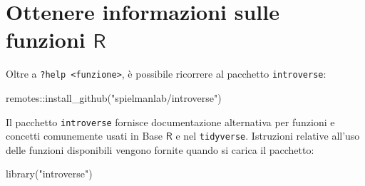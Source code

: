\documentclass[
  11pt,
]{krantz}
\makeatletter
\newenvironment{Shaded}{\begin{snugshade}}{\end{snugshade}}
\newcommand{\FunctionTok}[1]{\textcolor[rgb]{0,0,0}{#1}}
\newcommand{\NormalTok}[1]{#1}
\newcommand{\SpecialCharTok}[1]{\textcolor[rgb]{0,0,0}{#1}}
\newcommand{\StringTok}[1]{\textcolor[rgb]{0.5,0.5,0.5}{#1}}
\newenvironment{kframe}{%
\medskip{}
\setlength{\fboxsep}{.8em}
 \def\at@end@of@kframe{}%
 \ifinner\ifhmode%
  \def\at@end@of@kframe{\end{minipage}}%
  \begin{minipage}{\columnwidth}%
 \fi\fi%
 \def\FrameCommand##1{\hskip\@totalleftmargin \hskip-\fboxsep
 \colorbox{shadecolor}{##1}\hskip-\fboxsep
     \hskip-\linewidth \hskip-\@totalleftmargin \hskip\columnwidth}%
 \MakeFramed {\advance\hsize-\width
   \@totalleftmargin\z@ \linewidth\hsize
   \@setminipage}}%
 {\par\unskip\endMakeFramed%
 \at@end@of@kframe}
\renewenvironment{Shaded}{\begin{kframe}}{\end{kframe}}
\newcommand{\R}{\textsf{R}} %
\theoremstyle{definition}
\theoremstyle{definition}
\theoremstyle{definition}
\theoremstyle{definition}
\theoremstyle{remark}
\makeatother
\begin{document}
\hypertarget{ottenere-informazioni-sulle-funzioni-r}{%
\section{\texorpdfstring{Ottenere informazioni sulle funzioni \(\R\)}{Ottenere informazioni sulle funzioni \textbackslash R}}\label{ottenere-informazioni-sulle-funzioni-r}}

Oltre a \texttt{?help\ \textless{}funzione\textgreater{}}, è possibile ricorrere al pacchetto \texttt{introverse}:

\begin{Shaded}
\begin{Highlighting}[]
\NormalTok{remotes}\SpecialCharTok{::}\FunctionTok{install\_github}\NormalTok{(}\StringTok{"spielmanlab/introverse"}\NormalTok{)}
\end{Highlighting}
\end{Shaded}

\noindent Il pacchetto \texttt{introverse} fornisce documentazione alternativa per funzioni e concetti comunemente usati in Base \(\R\) e nel \texttt{tidyverse}. Istruzioni relative all'uso delle funzioni disponibili vengono fornite quando si carica il pacchetto:

\begin{Shaded}
\begin{Highlighting}[]
\FunctionTok{library}\NormalTok{(}\StringTok{"introverse"}\NormalTok{)}
\end{Highlighting}
\end{Shaded}
\end{document}
